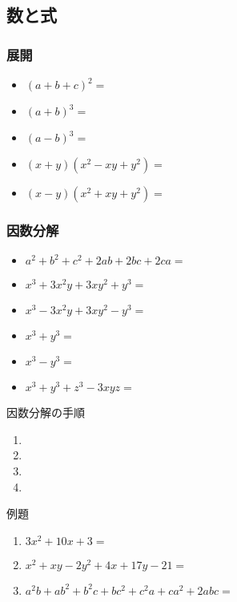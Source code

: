 \documentclass[10pt,dvipdfmx]{jsarticle}
\begin{document}
\subsection*{数と式}
\subsubsection*{展開}
\begin{Large}
  \begin{itemize}
    \item $(a+b+c)^2=$
    \item $(a+b)^3=$
    \item $(a-b)^3=$
    \item $(x+y)(x^2-xy+y^2)=$
    \item $(x-y)(x^2+xy+y^2)=$
  \end{itemize}
\end{Large}

\subsubsection*{因数分解}
\begin{Large}
  \begin{itemize}
    \item $a^2+b^2+c^2+2ab+2bc+2ca=$
    \item $x^3+3x^2y+3xy^2+y^3=$
    \item  $x^3-3x^2y+3xy^2-y^3=$
    \item $x^3+y^3=$
    \item $x^3-y^3=$
    \item $x^3+y^3+z^3-3xyz=$
  \end{itemize}
\end{Large}
\begin{itembox}[l]{因数分解の手順}
  \begin{Large}
    \begin{enumerate}
      \item %
      \item %
      \item %
      \item %
    \end{enumerate}
  \end{Large}
\end{itembox}

\begin{itembox}[l]{例題}
  \begin{large}
    \begin{enumerate}
      \item $3x^2+10x+3=$
      \item $x^2+xy-2y^2+4x+17y-21=$
      \item $a^2b+ab^2+b^2c+bc^2+c^2a+ca^2+2abc=$
    \end{enumerate}
  \end{large}
\end{itembox}
\end{document}
